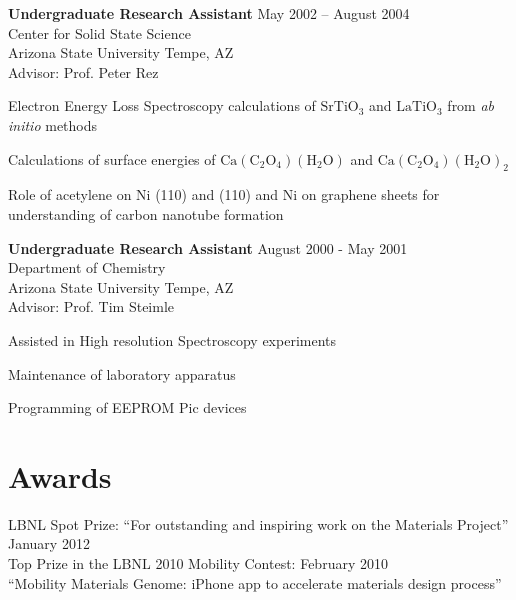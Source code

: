 \documentclass[margin,line]{resume}
\begin{document}
\begin{resume}
		\textbf{Undergraduate Research Assistant} \hfill May 2002 – August 2004\vspace{1mm}\\
		Center for Solid State Science\\
Arizona State University Tempe, AZ\\
Advisor: Prof. Peter Rez\\\vspace{-1.5mm}
		\begin{list2}
			\item Electron Energy Loss Spectroscopy calculations of $\mathrm{SrTiO_3}$ and $\mathrm{LaTiO_3}$ from \textsl{ab initio} methods
			\item Calculations of surface energies of $\mathrm{Ca(C_2O_4)(H_2O)}$ and $\mathrm{Ca(C_2O_4)(H_2O)_2}$
			\item Role of acetylene on Ni (110) and (110) and Ni on graphene sheets for understanding of carbon nanotube formation
		\end{list2}
		
		\textbf{Undergraduate Research Assistant} \hfill August 2000 - May 2001\vspace{1mm}\\
		Department of Chemistry\\
Arizona State University Tempe, AZ\\
Advisor: Prof. Tim Steimle\\\vspace{-1.5mm}
		\begin{list2}
		\renewcommand{\labelitemi}{$\star$}
		\item Assisted in High resolution Spectroscopy experiments
		\item Maintenance of laboratory apparatus
		\item Programming of EEPROM Pic devices
		\end{list2}


    \section{\mysidestyle Awards}
    LBNL Spot Prize: ``For outstanding and inspiring
      work on the Materials Project'' \hfill January 2012\vspace{2mm}\\
    Top Prize in the LBNL 2010 Mobility Contest: \hfill February 2010\\
      ``Mobility Materials Genome: iPhone app to
       accelerate materials design process''


\end{resume}
\end{document}
